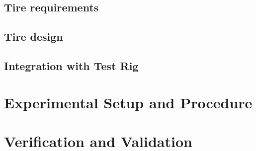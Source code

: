 \documentclass{article}
\begin{document}
\begin{figure}[hbt!]
\begin{minipage}{0.28\textwidth}
    \end{minipage}
        \begin{minipage}{0.35\textwidth}
        \centering
    \end{minipage}\par\medskip
    \caption{}
    \label{soa_wheels}
\end{figure}

\subsection{Tire requirements}

\subsection{Tire design}

\subsection{Integration with Test Rig}

\section{Experimental Setup and Procedure}


\section{Verification and Validation}
\end{document}
